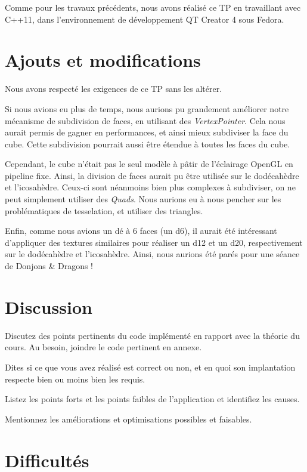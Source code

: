 \documentclass[10pt,a4paper]{article}
\begin{document}
Comme pour les travaux précédents, nous avons réalisé ce TP en travaillant avec C++11, dans l'environnement de développement QT Creator 4 sous Fedora.

\section{Ajouts et modifications}

Nous avons respecté les exigences de ce TP sans les altérer.

Si nous avions eu plus de temps, nous aurions pu grandement améliorer notre mécanisme de subdivision de faces, en utilisant des \textit{VertexPointer}. Cela nous aurait permis de gagner en performances, et ainsi mieux subdiviser la face du cube. Cette subdivision pourrait aussi être étendue à toutes les faces du cube.

Cependant, le cube n'était pas le seul modèle à pâtir de l'éclairage OpenGL en pipeline fixe. Ainsi, la division de faces aurait pu être utilisée sur le dodécahèdre et l'icosahèdre. Ceux-ci sont néanmoins bien plus complexes à subdiviser, on ne peut simplement utiliser des \textit{Quads}. Nous aurions eu à nous pencher sur les problématiques de tesselation, et utiliser des triangles.

Enfin, comme nous avions un dé à 6 faces (un d6), il aurait été intéressant d'appliquer des textures similaires pour réaliser un d12 et un d20, respectivement sur le dodécahèdre et l'icosahèdre. Ainsi, nous aurions été parés pour une séance de Donjons \& Dragons !

\section{Discussion}

\og
    Discutez des points pertinents du code implémenté en rapport avec la théorie du cours. Au besoin, joindre le code pertinent en annexe.
    
    Dites si ce que vous avez réalisé est correct ou non, et en quoi son implantation respecte bien ou moins bien les requis.
    
    Listez les points forts et les points faibles de l'application et identifiez les causes.
    
    Mentionnez les améliorations et optimisations possibles et faisables.
\fg



\section{Difficultés}
\end{document}
